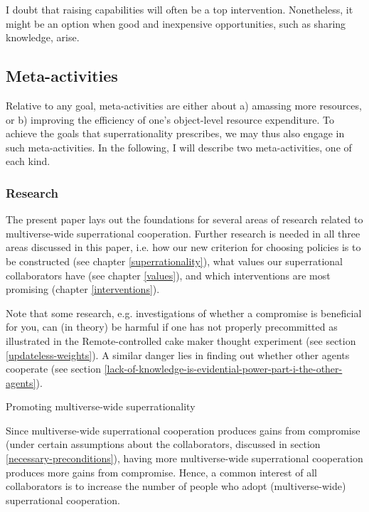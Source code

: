 I doubt that raising capabilities will often be a top intervention.
Nonetheless, it might be an option when good and inexpensive
opportunities, such as sharing knowledge, arise.

\hypertarget{meta-activities}{\subsection{Meta-activities}\label{meta-activities}}

Relative to any goal, meta-activities are either about a) amassing more
resources, or b) improving the efficiency of one's object-level resource
expenditure. To achieve the goals that superrationality prescribes, we
may thus also engage in such meta-activities. In the following, I will
describe two meta-activities, one of each kind.

\subsubsection{Research}\label{research}

The present paper lays out the foundations for several areas of research
related to multiverse-wide superrational cooperation. Further research
is needed in all three areas discussed in this paper, i.e. how our new
criterion for choosing policies is to be constructed (see chapter
\ref{superrationality}), what
values our superrational collaborators have (see chapter
\ref{values}), and which interventions
are most promising (chapter
\ref{interventions}).

Note that some research, e.g. investigations of whether a compromise is
beneficial for you, can (in theory) be harmful if one has not properly
precommitted as illustrated in the Remote-controlled cake maker thought
experiment (see section
\ref{updateless-weights}).
A similar danger lies in finding out whether other agents cooperate (see
section
\ref{lack-of-knowledge-is-evidential-power-part-i-the-other-agents}).

Promoting multiverse-wide superrationality

Since multiverse-wide superrational cooperation produces gains from
compromise (under certain assumptions about the collaborators, discussed
in section \ref{necessary-preconditions}), having more multiverse-wide superrational
cooperation produces more gains from compromise. Hence, a common
interest of all collaborators is to increase the number of people who
adopt (multiverse-wide) superrational cooperation.

